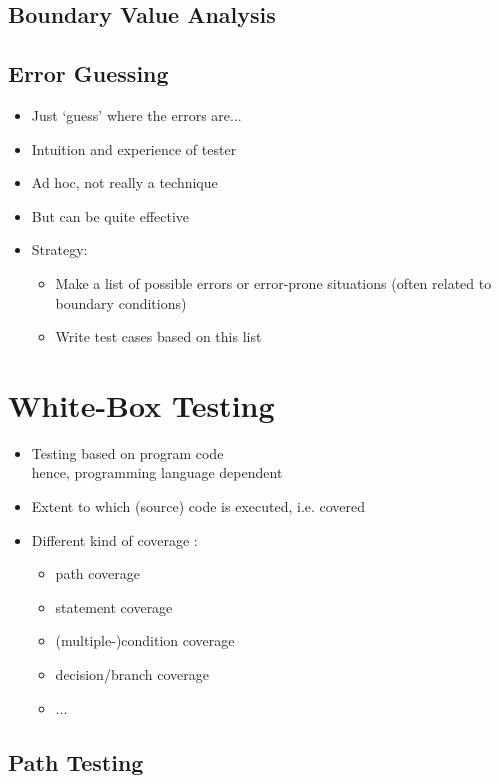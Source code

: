 			
\subsection{Boundary Value Analysis}
		
\subsection{Error Guessing}
			
\begin{itemize}
	\item Just ‘guess’ where the errors are...
	\item Intuition and experience of tester
	\item Ad hoc, not really a technique
	\item But can be quite effective
	\item Strategy:
	\begin{itemize}
		\item Make a list of possible errors or error-prone situations (often related to boundary conditions)
		\item Write test cases based on this list
	\end{itemize}
\end{itemize}
			
\section{White-Box Testing}
		
\begin{itemize}
	\itemsep0em
	\item Testing based on program code\\
	hence, programming language dependent
	\item Extent to which (source) code is executed, i.e. covered
	\item Different kind of coverage :
	\begin{itemize}
		\itemsep0em
		\item path coverage
		\item statement coverage
		\item (multiple-)condition coverage
		\item decision/branch coverage
		\item ...
	\end{itemize}			
\end{itemize}
			
\subsection{Path Testing}
				
